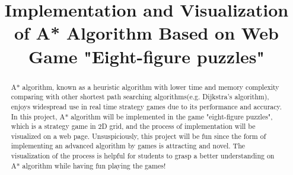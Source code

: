 \documentclass[10pt,conference]{IEEEtran}
\begin{document}
\title{Implementation and Visualization of A* Algorithm Based on Web Game "Eight-figure puzzles"}
\author{
\and
{}
\and
{}
}

\maketitle
\begin{abstract}
\textnormal{
A* algorithm, known as a heuristic algorithm with lower time and memory complexity comparing with other shortest path searching algorithms(e.g. Dijkstra's algorithm), enjoys widespread use in real time strategy games due to its performance and accuracy. In this project, A* algorithm will be implemented in the game "eight-figure puzzles", which is a strategy game in 2D grid, and the process of implementation will be visualized on a web page. Unsuspiciously, this project will be fun since the form of implementing an advanced algorithm by games is attracting and novel. The visualization of the process is helpful for students to grasp a better understanding on A* algorithm while having fun playing the games!
}
\end{abstract}

\IEEEpeerreviewmaketitle
\end{document}
